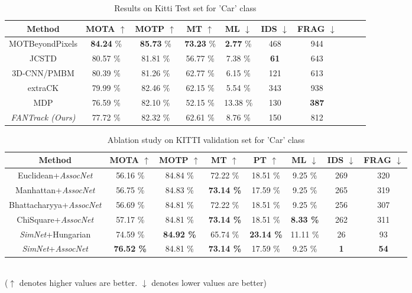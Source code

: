 \documentclass[letterpaper, 10 pt, conference]{ieeeconf}
\begin{document}
\begin{table*}[ht]
\vspace{1.5em}
\caption{Results on Kitti Test set for 'Car' class}
\centering
\begin{tabular}{c | c | c | c | c | c | c | c | c | c}
\hline \hline
{\bf Method} & {\bf MOTA $\uparrow$} & {\bf MOTP $\uparrow$} & {\bf MT $\uparrow$} & {\bf ML $\downarrow$} & {\bf IDS $\downarrow$} & {\bf FRAG $\downarrow$}\\ 
\hline \hline
MOTBeyondPixels \cite{beyondmot} & {\bf84.24} \% & {\bf85.73} \% & {\bf73.23} \% & {\bf2.77} \% & 468 & 944\\
JCSTD \cite{xiao2010vehicle} & 80.57 \% & 81.81 \% & 56.77 \% & 7.38 \% & {\bf61} & 643\\
3D-CNN/PMBM \cite{scheidegger2018mono} & 80.39 \% & 81.26 \% & 62.77 \% & 6.15 \% & 121 & 613\\
extraCK \cite{gunduz2018lightweight} & 79.99 \% & 82.46 \% & 62.15 \% & 5.54 \% & 343 & 938\\
MDP \cite{xiang2015learning} & 76.59 \% & 82.10 \% & 52.15 \% & 13.38 \% & 130 & {\bf387}\\
\hline
\textit{FANTrack (Ours)} & 77.72 \% & 82.32 \% & 62.61 \% & 8.76 \% & 150 &
812\\
\hline \hline
\end{tabular}
\label{table:testresults}
\vspace{-1.5em}
\end{table*}

\begin{table*}[ht]
\vspace{1.5em}
\caption{Ablation study on KITTI validation set for 'Car' class}
\centering
\begin{tabular}{cccccccc}
\hline \hline
Method & MOTA $\uparrow$ & MOTP $\uparrow$ & MT $\uparrow$ & PT $\uparrow$ & ML $\downarrow$ & IDS $\downarrow$ & FRAG $\downarrow$ \\
\hline \hline
Euclidean+\textit{AssocNet} & 56.16 \% & 84.84 \% & 72.22 \% & 18.51 \% & 9.25 \% & 269 & 320 \\
Manhattan+\textit{AssocNet} & 56.75 \% & 84.83 \% & \bf{73.14} \% & 17.59 \% & 9.25 \% & 265 & 319 \\
Bhattacharyya+\textit{AssocNet} & 56.69 \% & 84.81 \% & 72.22 \% & 18.51 \% & 9.25 \% & 256 & 307 \\
ChiSquare+\textit{AssocNet} & 57.17 \% & 84.81 \% & \bf{73.14} \% & 18.51 \% & \bf{8.33} \% & 262 & 311 \\
\textit{SimNet}+Hungarian & 74.59 \% & \bf{84.92} \% & 65.74 \% & \bf{23.14} \% & 11.11 \% & 26 & 93 \\
\textit{SimNet}+\textit{AssocNet} & \bf{76.52} \% & 84.81 \% & \bf{73.14} \% & 17.59 \% & 9.25 \% & \bf{1} & \bf{54} \\
\hline
\end{tabular}
\label{table:ablation}
\\[5pt]
($\uparrow$ denotes higher values are better. $\downarrow$ denotes lower values are better)
\end{table*}
\end{document}
